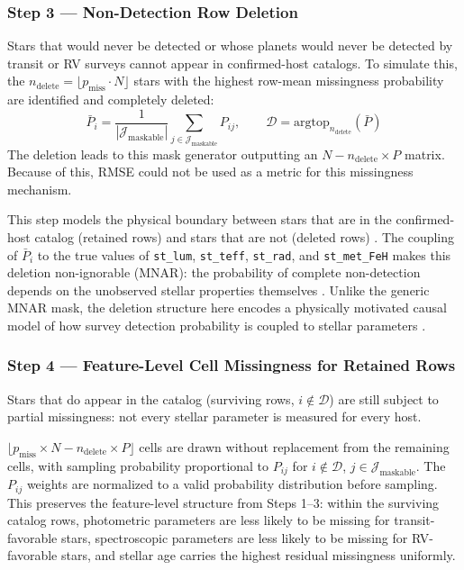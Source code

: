 \documentclass[preprint,longauthor,twocolumn]{aastex631}
\begin{document}
\subsubsection*{Step 3 --- Non-Detection Row Deletion}

Stars that would never be detected or whose planets would never be detected by transit or RV surveys cannot appear in confirmed-host catalogs. To simulate this, the $n_{\mathrm{delete}} = \lfloor p_{\mathrm{miss}} \cdot N \rfloor$ stars with the highest row-mean missingness probability are identified and completely deleted:
\begin{equation}
  \bar{P}_i = \frac{1}{|\mathcal{J}_{\mathrm{maskable}}|} \sum_{j \in \mathcal{J}_{\mathrm{maskable}}} P_{ij},
  \qquad \mathcal{D} = \mathrm{argtop}_{n_{\mathrm{delete}}}(\bar{P})
  \label{eq:row-deletion}
\end{equation}
The deletion leads to this mask generator outputting an $N-n_{\mathrm{delete}} \times P$ matrix. Because of this, RMSE could not be used as a metric for this missingness mechanism.

This step models the physical boundary between stars that are in the confirmed-host catalog (retained rows) and stars that are not (deleted rows) \citep{gaidosOBJECTSKEPLERSMIRROR2012,burkeTERRESTRIALPLANETOCCURRENCE2015}. The coupling of $\bar{P}_i$ to the true values of \texttt{st\_lum}, \texttt{st\_teff}, \texttt{st\_rad}, and \texttt{st\_met\_FeH} makes this deletion non-ignorable (MNAR): the probability of complete non-detection depends on the unobserved stellar properties themselves \citep{hsuOccurrenceRatesPlanets2019}. Unlike the generic MNAR mask, the deletion structure here encodes a physically motivated causal model of how survey detection probability is coupled to stellar parameters \citep{mirchandaniDetectionBiasesMethodological2025}.

\subsubsection*{Step 4 --- Feature-Level Cell Missingness for Retained Rows}

Stars that do appear in the catalog (surviving rows, $i \notin \mathcal{D}$) are still subject to partial missingness: not every stellar parameter is measured for every host.

$\lfloor p_{\mathrm{miss}} \times N-n_{\mathrm{delete}} \times P\Bigr\rfloor$ cells are drawn without replacement from the remaining cells, with sampling probability proportional to $P_{ij}$ for $i \notin \mathcal{D}$, $j \in \mathcal{J}_{\mathrm{maskable}}$. The $P_{ij}$ weights are normalized to a valid probability distribution before sampling. This preserves the feature-level structure from Steps 1--3: within the surviving catalog rows, photometric parameters are less likely to be missing for transit-favorable stars, spectroscopic parameters are less likely to be missing for RV-favorable stars, and stellar age carries the highest residual missingness uniformly.
\end{document}
